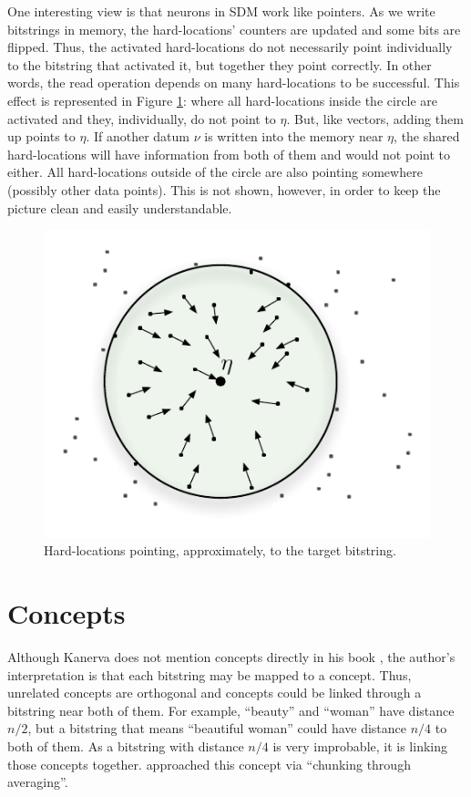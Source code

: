 One interesting view is that neurons in SDM work like pointers. As we write bitstrings in memory, the hard-locations' counters are updated and some bits are flipped. Thus, the activated hard-locations do not necessarily point individually to the bitstring that activated it, but together they point correctly. In other words, the read operation depends on many hard-locations to be successful. This effect is represented in Figure \ref{fig-p1-pointers}: where all hard-locations inside the circle are activated and they, individually, do not point to $\eta$.  But, like vectors, adding them up points to $\eta$. If another datum $\nu$ is written into the memory near $\eta$, the shared hard-locations will have information from both of them and would not point to either.  All hard-locations outside of the circle are also pointing somewhere (possibly other data points). This is not shown, however, in order to keep the picture clean and easily understandable.

\begin{figure}[!htb]
\centering\includegraphics[scale=0.75]{./images02/p1_after_write.pdf}

\caption{Hard-locations pointing, approximately, to the target bitstring.\label{fig-p1-pointers}}
\end{figure}



\section{Concepts}

Although Kanerva does not mention concepts directly in his book \citep{Kanerva1988}, the author's interpretation is that each bitstring may be mapped to a concept. Thus, unrelated concepts are orthogonal and concepts could be linked through a bitstring near both of them. For example, ``beauty'' and ``woman'' have distance $n/2$, but a bitstring that means ``beautiful woman'' could have distance $n/4$ to both of them. As a bitstring with distance $n/4$ is very improbable, it is linking those concepts together. \citet{Linhares2011} approached this concept via ``chunking through averaging''.

